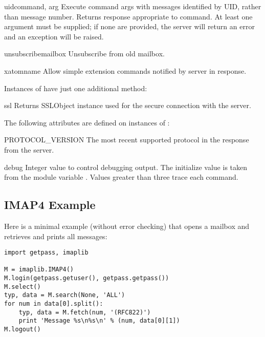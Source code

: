 \begin{methoddesc}{uid}{command, arg}
  Execute command args with messages identified by UID, rather than
  message number.  Returns response appropriate to command.  At least
  one argument must be supplied; if none are provided, the server will
  return an error and an exception will be raised.
\end{methoddesc}

\begin{methoddesc}{unsubscribe}{mailbox}
  Unsubscribe from old mailbox.
\end{methoddesc}

\begin{methoddesc}{xatom}{name}
  Allow simple extension commands notified by server in
   response.
\end{methoddesc}


Instances of  have just one additional method:

\begin{methoddesc}{ssl}{}
  Returns SSLObject instance used for the secure connection with the server.
\end{methoddesc}


The following attributes are defined on instances of :


\begin{memberdesc}{PROTOCOL_VERSION}
The most recent supported protocol in the
 response from the server.
\end{memberdesc}

\begin{memberdesc}{debug}
Integer value to control debugging output.  The initialize value is
taken from the module variable .  Values greater than
three trace each command.
\end{memberdesc}


\subsection{IMAP4 Example \label{imap4-example}}

Here is a minimal example (without error checking) that opens a
mailbox and retrieves and prints all messages:

\begin{verbatim}
import getpass, imaplib

M = imaplib.IMAP4()
M.login(getpass.getuser(), getpass.getpass())
M.select()
typ, data = M.search(None, 'ALL')
for num in data[0].split():
    typ, data = M.fetch(num, '(RFC822)')
    print 'Message %s\n%s\n' % (num, data[0][1])
M.logout()
\end{verbatim}

